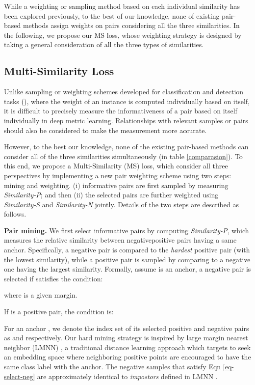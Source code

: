 \documentclass[10pt,twocolumn,letterpaper]{article}
\begin{document}
While a weighting or sampling method based on each individual similarity has been explored previously, to the best of our knowledge, none of existing pair-based methods assign weights on pairs considering all the three similarities. In the following, we propose our MS loss, whose weighting strategy is designed by taking a general consideration of all the three types of similarities.

\subsection{Multi-Similarity Loss}
Unlike sampling or weighting schemes developed for classification and detection tasks (\cite{chang2017active,focal_loss}), where the weight of an instance is computed individually based on itself, it is difficult to precisely measure the informativeness of a pair based on itself individually in deep metric learning. Relationships with relevant samples or pairs should also be considered to make the measurement more accurate.  

However, to the best our knowledge, none of the existing pair-based methods can consider all of the three similarities simultaneously (in table \ref{comparasion}). To this end, we propose a Multi-Similarity (MS) loss, which consider all three perspectives by implementing a new pair weighting scheme using two steps: mining and weighting. (i) informative pairs are first sampled by measuring {\it Similarity-P}; and then (ii) the selected pairs are further weighted using {\it Similarity-S} and {\it Similarity-N} jointly. Details of the two steps are described as follows.

{\bf Pair mining.}  We first select informative pairs by computing {\it Similarity-P}, which measures the relative similarity between negativepositive pairs having a same anchor.
Specifically, a negative pair is compared to the {\it hardest} positive pair (with the lowest similarity), while a positive pair is sampled by comparing to a negative one having the largest similarity. Formally, assume  is an anchor, a negative pair   is selected if  satisfies the condition:

where  is a given margin.

If  is a positive pair, the condition is:


For an anchor , we denote the index set of its selected positive and negative pairs as 
 and   respectively.
Our hard mining strategy is inspired by large margin nearest neighbor (LMNN) \cite{LMNN}, a traditional distance learning approach which targets to seek an embedding space where neighboring positive points are encouraged to have the same class label with the anchor.
The negative samples that satisfy Eqn \ref{eq-select-neg} are approximately identical to  {\it impostors} defined in LMNN \cite{LMNN}. 
\end{document}
